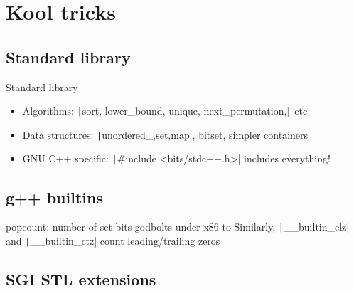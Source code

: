 \documentclass[12pt,presentation,hyperref={unicode},aspectratio=169]{beamer}
\begin{document}

\section{Kool tricks}

\subsection{Standard library}
\begin{frame}[fragile]{Standard library}
  \begin{itemize}
    \item<1-> Algorithms: \texttt|sort, lower_bound, unique, next_permutation,|~etc
    \item<1-> Data structures: \texttt|{unordered_,}{set,map}|,
      bitset,
      simpler containers
    \item<2-> GNU C++ specific:
        \texttt|#include <bits/stdc++.h>| includes everything!
  \end{itemize}
\end{frame}

\subsection{g++ builtins}

\begin{frame}[fragile]{popcount: number of set bits}
  godbolts under x86 to
  Similarly,
  \texttt|__builtin_clz| and \texttt|__builtin_ctz|
  count leading/trailing zeros
\end{frame}

\subsection{SGI STL extensions}

\end{document}
